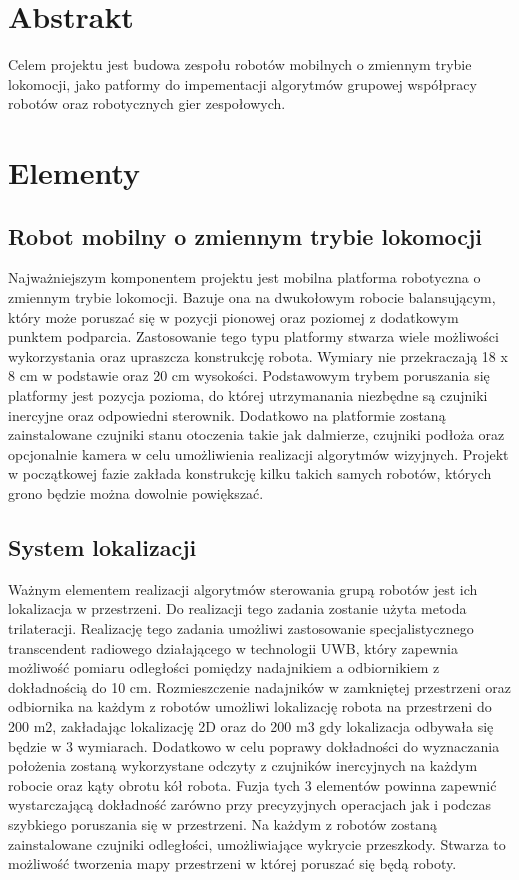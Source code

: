 \documentclass[a4paper, 12pt]{article}
\begin{document}
	
\section{Abstrakt}
Celem projektu jest budowa zespołu robotów mobilnych o zmiennym trybie lokomocji, jako patformy do impementacji algorytmów grupowej współpracy robotów oraz robotycznych gier zespołowych.


\section{Elementy}
\subsection{Robot mobilny o zmiennym trybie lokomocji}
Najważniejszym komponentem projektu jest mobilna platforma robotyczna o zmiennym trybie lokomocji. Bazuje ona na dwukołowym robocie balansującym, który może poruszać się w pozycji pionowej oraz poziomej z dodatkowym punktem podparcia. Zastosowanie tego typu platformy stwarza wiele możliwości wykorzystania oraz upraszcza konstrukcję robota. Wymiary nie przekraczają 18 x 8 cm w podstawie oraz 20 cm wysokości. Podstawowym trybem poruszania się platformy jest pozycja pozioma, do której utrzymanania niezbędne są czujniki inercyjne oraz odpowiedni sterownik. Dodatkowo na platformie zostaną zainstalowane czujniki stanu otoczenia takie jak dalmierze, czujniki podłoża oraz opcjonalnie kamera w celu umożliwienia realizacji algorytmów wizyjnych. Projekt w początkowej fazie zakłada konstrukcję kilku takich samych robotów, których grono będzie można dowolnie powiększać. 

\subsection{System lokalizacji}
Ważnym elementem realizacji algorytmów sterowania grupą robotów jest ich lokalizacja w przestrzeni. Do realizacji tego zadania zostanie użyta metoda trilateracji. Realizację tego zadania umożliwi zastosowanie specjalistycznego transcendent radiowego działającego w technologii UWB, który zapewnia możliwość pomiaru odległości pomiędzy nadajnikiem a odbiornikiem z dokładnością do 10 cm. Rozmieszczenie nadajników w zamkniętej przestrzeni oraz odbiornika na każdym z robotów umożliwi lokalizację robota na przestrzeni do 200 m2, zakładając lokalizację 2D oraz do 200 m3 gdy lokalizacja odbywała się będzie w 3 wymiarach. Dodatkowo w celu poprawy dokładności do wyznaczania położenia zostaną wykorzystane odczyty z czujników inercyjnych na każdym robocie oraz kąty obrotu kół robota. Fuzja tych 3 elementów powinna zapewnić wystarczającą dokładność zarówno przy precyzyjnych operacjach jak i podczas szybkiego poruszania się w przestrzeni. Na każdym z robotów zostaną zainstalowane czujniki odległości, umożliwiające wykrycie przeszkody. Stwarza to możliwość tworzenia mapy przestrzeni w której poruszać się będą roboty.
\end{document}
